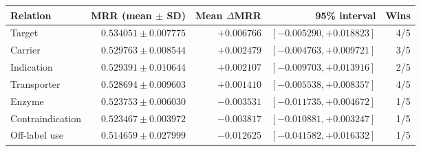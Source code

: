 \begin{tabular}{lrrrr}
\toprule
Relation & MRR (mean $\pm$ SD) & Mean $\Delta$MRR & 95\% interval & Wins \\
\midrule
Target & $0.534051 \pm 0.007775$ & $+0.006766$ & $[-0.005290, +0.018823]$ & 4/5 \\
Carrier & $0.529763 \pm 0.008544$ & $+0.002479$ & $[-0.004763, +0.009721]$ & 3/5 \\
Indication & $0.529391 \pm 0.010644$ & $+0.002107$ & $[-0.009703, +0.013916]$ & 2/5 \\
Transporter & $0.528694 \pm 0.009603$ & $+0.001410$ & $[-0.005538, +0.008357]$ & 4/5 \\
Enzyme & $0.523753 \pm 0.006030$ & $-0.003531$ & $[-0.011735, +0.004672]$ & 1/5 \\
Contraindication & $0.523467 \pm 0.003972$ & $-0.003817$ & $[-0.010881, +0.003247]$ & 1/5 \\
Off-label use & $0.514659 \pm 0.027999$ & $-0.012625$ & $[-0.041582, +0.016332]$ & 1/5 \\
\bottomrule
\end{tabular}
